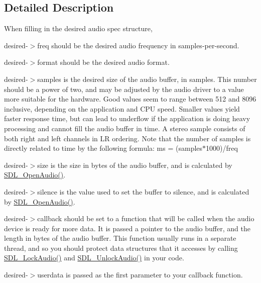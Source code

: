 \subsection{Detailed Description}
When filling in the desired audio spec structure,
\begin{DoxyItemize}
\item \textquotesingle{}desired-\/$>$freq\textquotesingle{} should be the desired audio frequency in samples-\/per-\/second.
\item \textquotesingle{}desired-\/$>$format\textquotesingle{} should be the desired audio format.
\item \textquotesingle{}desired-\/$>$samples\textquotesingle{} is the desired size of the audio buffer, in samples. This number should be a power of two, and may be adjusted by the audio driver to a value more suitable for the hardware. Good values seem to range between 512 and 8096 inclusive, depending on the application and C\+P\+U speed. Smaller values yield faster response time, but can lead to underflow if the application is doing heavy processing and cannot fill the audio buffer in time. A stereo sample consists of both right and left channels in L\+R ordering. Note that the number of samples is directly related to time by the following formula\+: ms = (samples$\ast$1000)/freq
\item \textquotesingle{}desired-\/$>$size\textquotesingle{} is the size in bytes of the audio buffer, and is calculated by \hyperlink{_s_d_l__audio_8h_a2edf30e7747584e28041b4986f89f440}{S\+D\+L\+\_\+\+Open\+Audio()}.
\item \textquotesingle{}desired-\/$>$silence\textquotesingle{} is the value used to set the buffer to silence, and is calculated by \hyperlink{_s_d_l__audio_8h_a2edf30e7747584e28041b4986f89f440}{S\+D\+L\+\_\+\+Open\+Audio()}.
\item \textquotesingle{}desired-\/$>$callback\textquotesingle{} should be set to a function that will be called when the audio device is ready for more data. It is passed a pointer to the audio buffer, and the length in bytes of the audio buffer. This function usually runs in a separate thread, and so you should protect data structures that it accesses by calling \hyperlink{_s_d_l__audio_8h_a7ffa484f230f6085e271a4f43e678f06}{S\+D\+L\+\_\+\+Lock\+Audio()} and \hyperlink{_s_d_l__audio_8h_a76d8179bee14dad268e65378058d897d}{S\+D\+L\+\_\+\+Unlock\+Audio()} in your code.
\item \textquotesingle{}desired-\/$>$userdata\textquotesingle{} is passed as the first parameter to your callback function.
\end{DoxyItemize}

